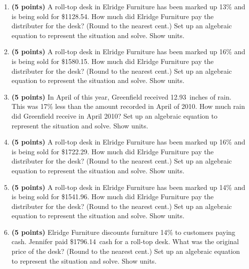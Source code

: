 \documentclass[12pt]{amsart}
\begin{document}
\begin{enumerate}
\vfill 
\def \discount{13}\def \paid{1128.54}\def \rainy{8.89}\def \orcost{1297.17}\def \purcost{998.71}\def \orrainy{10.22}
\item {\bf (5 points)} 
 A roll-top desk in Elridge Furniture has been marked up \discount\% and is being sold for \$\paid. How much did Elridge Furniture pay the distributer for the desk? (Round to the nearest cent.) Set up an algebraic equation to represent the situation and solve. Show units.

\vfill 
\def \discount{16}\def \paid{1580.15}\def \rainy{13.54}\def \orcost{1881.13}\def \purcost{1362.20}\def \orrainy{16.12}
\item {\bf (5 points)} 
 A roll-top desk in Elridge Furniture has been marked up \discount\% and is being sold for \$\paid. How much did Elridge Furniture pay the distributer for the desk? (Round to the nearest cent.) Set up an algebraic equation to represent the situation and solve. Show units.

\vfill 
\def \discount{17}\def \paid{1430.82}\def \rainy{12.93}\def \orcost{1723.88}\def \purcost{1222.92}\def \orrainy{15.58}
\item {\bf (5 points)} 
 In April of this year, Greenfield received \rainy\ inches of rain. This was \discount\% less than the amount recorded in April of 2010. How much rain did Greenfield  receive in April 2010? Set up an algebraic equation to represent the situation and solve. Show units.

\vfill 
\def \discount{16}\def \paid{1722.29}\def \rainy{11.38}\def \orcost{2050.35}\def \purcost{1484.73}\def \orrainy{13.55}
\item {\bf (5 points)} 
 A roll-top desk in Elridge Furniture has been marked up \discount\% and is being sold for \$\paid. How much did Elridge Furniture pay the distributer for the desk? (Round to the nearest cent.) Set up an algebraic equation to represent the situation and solve. Show units.

\vfill 
\def \discount{14}\def \paid{1541.96}\def \rainy{9.25}\def \orcost{1792.98}\def \purcost{1352.60}\def \orrainy{10.76}
\item {\bf (5 points)} 
 A roll-top desk in Elridge Furniture has been marked up \discount\% and is being sold for \$\paid. How much did Elridge Furniture pay the distributer for the desk? (Round to the nearest cent.) Set up an algebraic equation to represent the situation and solve. Show units.

\vfill 
\def \discount{14}\def \paid{1796.14}\def \rainy{10.19}\def \orcost{2088.53}\def \purcost{1575.56}\def \orrainy{11.85}
\item {\bf (5 points)} 
 Elridge Furniture discounts furniture \discount\% to customers paying cash. Jennifer paid \$\paid\ cash for a roll-top desk. What was the original price of the desk? (Round to the nearest cent.) Set up an algebraic equation to represent the situation and solve. Show units.


\end{enumerate}
\end{document}
